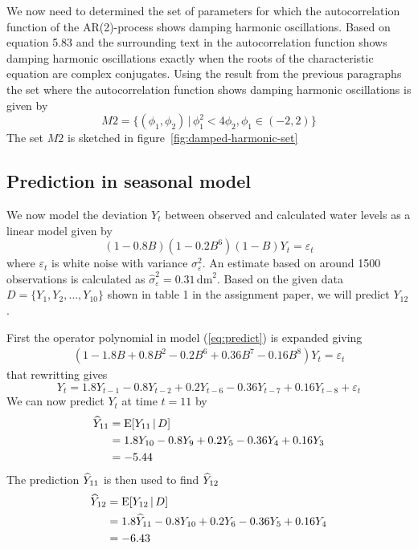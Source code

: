 We now need to determined the set of parameters for which the autocorrelation function of the AR(2)-process shows damping harmonic oscillations. Based on equation 5.83 and the surrounding text in \cite{hm} the autocorrelation function shows damping harmonic oscillations exactly when the roots of the characteristic equation are complex conjugates. Using the result from the previous paragraphs the set where the autocorrelation function shows damping harmonic oscillations is given by
\begin{equation*}
    M2 = \{(\phi_1, \phi_2) \,|\, \phi_1^2<4\phi_2, \phi_1\in(-2,2)\}
\end{equation*}
The set $M2$ is sketched in figure~\ref{fig:damped-harmonic-set}

\subsection*{Prediction in seasonal model}
We now model the deviation $Y_t$ between observed and calculated water levels as a linear model given by
\begin{equation}\label{eq:predict}
    (1-0.8B)(1-0.2B^6)(1-B)Y_t = \varepsilon_t
\end{equation}
where $\varepsilon_t$ is white noise with variance $\sigma^2_\varepsilon$. An estimate based on around 1500 observations is calculated as $\hat{\sigma}^2_\varepsilon=0.31\,\text{dm}^2$. Based on the given data $D=\{Y_1, Y_2, \dots, Y_{10}\}$ shown in table 1 in the assignment paper, we will predict $Y_{12}$.\par
First the operator polynomial in model (\ref{eq:predict}) is expanded giving
\begin{align*}
    (1 - 1.8B + 0.8B^2 - 0.2B^6 + 0.36B^7 - 0.16B^8)Y_t = \varepsilon_t 
\end{align*}
that rewritting gives 
\begin{equation*}
    Y_t = 1.8Y_{t-1} - 0.8Y_{t-2} + 0.2Y_{t-6} - 0.36Y_{t-7} + 0.16Y_{t-8} + \varepsilon_t
\end{equation*}
We can now predict $Y_t$ at time $t=11$ by
\begin{align*}
    \widehat{Y}_{11} &= \text{E}[Y_{11}\,|\, D]\\
    &= 1.8Y_{10} - 0.8Y_9 + 0.2Y_5 -0.36Y_4 + 0.16Y_3\\
    &= -5.44
\end{align*}
The prediction $\widehat{Y}_{11}$ is then used to find $\widehat{Y}_{12}$
\begin{align*}
    \widehat{Y}_{12} &= \text{E}[Y_{12}\,|\, D] \\
    &= 1.8\widehat{Y}_{11} - 0.8Y_{10} + 0.2Y_6 - 0.36Y_5 + 0.16Y_4 \\
    &= -6.43
\end{align*}
